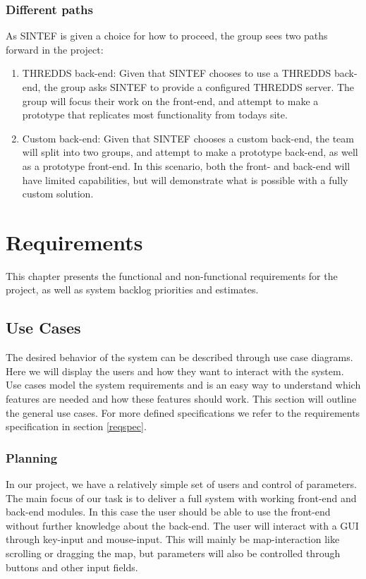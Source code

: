\documentclass[11pt,a4paper,titlepage,oneside]{report}
\begin{document}
\subsection{Different paths}
\label{subsec:DifferentPaths}
As SINTEF is given a choice for how to proceed, the group sees two paths forward in the project:
\begin{enumerate}
\item \gls{THREDDS} \gls{back-end}: Given that SINTEF chooses to use a \gls{THREDDS} \gls{back-end}, the group asks SINTEF to provide a configured \gls{THREDDS} server. The group will focus their work on the \gls{front-end}, and attempt to make a \gls{prototype} that replicates most functionality from todays site.
\item Custom \gls{back-end}: Given that SINTEF chooses a custom \gls{back-end}, the team will split into two groups, and attempt to make a \gls{prototype} \gls{back-end}, as well as a \gls{prototype} \gls{front-end}. In this scenario, both the front- and \gls{back-end} will have limited capabilities, but will demonstrate what is possible with a fully custom solution.
\end{enumerate}


\chapter{Requirements}
\label{chap:Requirements}
This chapter presents the functional and non-functional requirements for the project, as well as system backlog priorities and estimates.

\section{Use Cases}
The desired behavior of the system can be described through use case diagrams. Here we will display the users and how they want to interact with the system. Use cases model the system requirements and is an easy way to understand which features are needed and how these features should work. This section will outline the general use cases. For more defined specifications we refer to the requirements specification in section \ref{reqspec}.

  \subsection{Planning}
  In our project, we have a relatively simple set of users and control of parameters. The main focus of our task is to deliver a full system with working \gls{front-end} and \gls{back-end} modules. In this case the user should be able to use the \gls{front-end} without further knowledge about the \gls{back-end}. The user will interact with a \gls{GUI} through key-input and mouse-input. This will mainly be map-interaction like scrolling or dragging the map, but parameters will also be controlled through buttons and other input fields.
\end{document}
